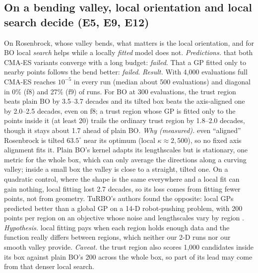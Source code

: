 \documentclass[10pt,a4paper]{article}
\begin{document}
\subsection{On a bending valley, local orientation and local search decide (E5, E9, E12)}
On Rosenbrock, whose valley bends, what matters is the local orientation, and for BO local \emph{search} helps while a
locally \emph{fitted} model does not. \textit{Predictions.} that both CMA-ES variants converge with a long budget:
\emph{failed}. That a GP fitted only to nearby points follows the bend better: \emph{failed}. \textit{Result.} With
4,000 evaluations full CMA-ES reaches $10^{-5}$ in every run (median about 500 evaluations) and diagonal in 0\% (f8) and 27\%
(f9) of runs. For BO at 300 evaluations, the trust region beats plain BO by 3.5--3.7 decades and its tilted box beats the
axis-aligned one by 2.0--2.5 decades, even on f8; a trust region whose GP is fitted only to the points inside it (at least 20)
trails the ordinary trust region by 1.8--2.0 decades, though it stays about 1.7 ahead of plain BO. \textit{Why (measured).} even
``aligned'' Rosenbrock is tilted $63.5^\circ$ near its optimum (local $\kappa\approx2{,}500$), so no fixed axis alignment fits it.
Plain BO's kernel adapts its lengthscales but is stationary, one metric for the whole box, which can only average the directions
along a curving valley; inside a small box the valley is close to a straight, tilted one. On a quadratic control, where the shape
is the same everywhere and a local fit can gain nothing, local fitting lost 2.7 decades, so its loss comes from fitting fewer
points, not from geometry. TuRBO's authors found the opposite: local GPs predicted better than a global GP on a 14-D
robot-pushing problem, with 200 points per region on an objective whose noise and lengthscales vary by region
\citep[Sec.~3.6]{eriksson2019turbo}. \textit{Hypothesis.} local fitting pays when each region holds enough data and the
function really differs between regions, which neither our 2-D runs nor our smooth valley provide. \textit{Caveat.} the
trust region also scores 1,000 candidates inside its box against plain BO's 200 across the whole box, so part of its lead may come
from that denser local search.
\end{document}
